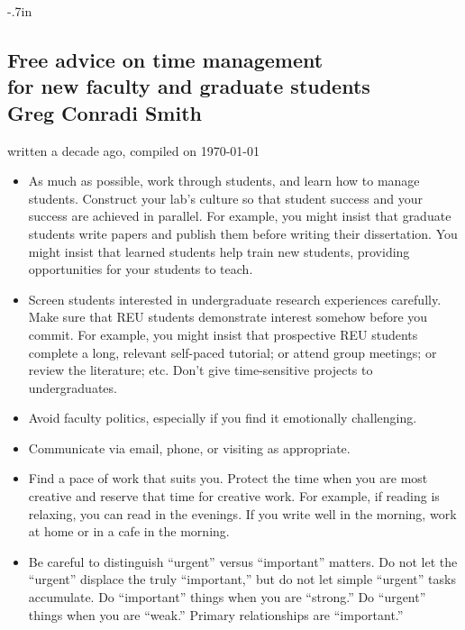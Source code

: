 \parindent 0.5in
\setlength{\oddsidemargin}{-0.35in}
\setlength{\textwidth}{7in}
\topmargin -.7in
\textheight 10.0in
\renewcommand{\baselinestretch}{1}



\begin{center}
\section*{Free advice on time management\\ 
\large for new faculty and graduate students\\[0.02in]
\large Greg Conradi Smith}
written a decade ago, compiled on \today
\end{center}

\begin{itemize}
\item As much as possible, work through students, and learn how to manage students.  Construct your lab's culture so that student success and your success are achieved in parallel.  For example, you might insist that graduate students write papers and publish them before writing their dissertation.  You might insist that learned students help train new students, providing opportunities for your students to teach. 

\item Screen students interested in undergraduate research experiences carefully.  Make sure that REU students demonstrate interest somehow before you commit.  For example, you might insist that prospective REU students complete a long, relevant self-paced tutorial; or attend group meetings; or review the literature; etc.   Don't give time-sensitive projects to undergraduates. 

\item Avoid faculty politics, especially if you find it emotionally challenging.  

\item Communicate via email, phone, or  visiting as appropriate. 

\item Find a pace of work that suits you.  Protect the time when you are most creative and reserve that time for creative work.   For example, if reading is relaxing, you can read in the evenings.  If you write well in the morning, work at home or in a cafe in the morning. 

\item Be careful to distinguish ``urgent'' versus ``important'' matters.  Do not let the ``urgent'' displace the truly ``important,'' but do not let simple ``urgent'' tasks accumulate.  Do ``important'' things when you are ``strong.''   Do ``urgent'' things when you are ``weak.''   Primary relationships are ``important.'' 


\end{itemize}
